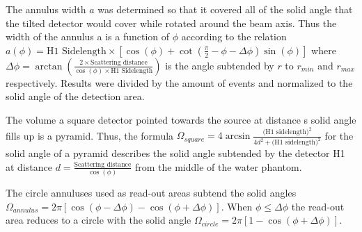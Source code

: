 The annulus width $a$ was determined so that it covered all of the solid angle that the tilted detector would cover while rotated around the beam axis. Thus the width of the annulus a is a function of $\phi$ according to the relation $a(\phi) = \text{H1 Sidelength} \times [\cos(\phi)+ \cot(\frac{\pi}{2} - \phi - \Delta\phi)\sin(\phi)]$ where $\Delta\phi = \arctan(\frac{2 \times \text{Scattering distance}}{\cos(\phi) \times \text{H1 Sidelength}})$ is the angle subtended by $r$ to $r_{min}$ and $r_{max}$ respectively.
Results were divided by the amount of events and normalized to the solid angle of the detection area.

The volume a square detector pointed towards the source at distance s solid angle fills up is a pyramid. Thus, the formula $\Omega_{square} = 4 \arcsin{\frac{\text{(H1 sidelength)}^2}{4d^2+\text{(H1 sidelength)}^2}}$ for the solid angle of a pyramid describes the solid angle subtended by the detector H1 at distance $d = \frac{\text{Scattering distance}}{\cos(\phi)}$ from the middle of the water phantom.

The circle annuluses used as read-out areas subtend the solid angles $\Omega_{annulus} = 2 \pi [\cos(\phi - \Delta\phi) - \cos(\phi + \Delta\phi)]$. When $\phi \le \Delta\phi$ the read-out area reduces to a circle with the solid angle $\Omega_{circle} = 2 \pi [1 - \cos(\phi + \Delta\phi)]$.




